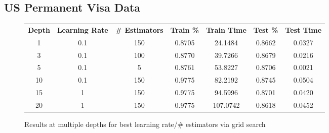 \documentclass[h]{article}
\begin{document}
\subsection*{US Permanent Visa Data}
\begin{figure}[H]
\begin{tabular}{ | c | c  | c | c | c | c | c |} 
\hline
\textbf{Depth} & \textbf{Learning Rate} & \textbf{\# Estimators} & \textbf{Train \%} & \textbf{Train Time} & \textbf{Test \%} & \textbf{Test Time}   \\
1 & 0.1 & 150 & 0.8705 & 24.1484 & 0.8662 & 0.0327 \\ \hline
3 & 0.1 & 100 & 0.8770 & 39.7266 & 0.8679 & 0.0216 \\ \hline
5 & 0.1 & 5 & 0.8761 & 53.8227 & 0.8706 & 0.0021 \\ \hline
10 & 0.1 & 150 & 0.9775 & 82.2192 & 0.8745 & 0.0504 \\ \hline
15 & 1 & 150 & 0.9775 & 94.5996 & 0.8701 & 0.0420 \\ \hline
20 & 1 & 150 & 0.9775 & 107.0742 & 0.8618 & 0.0452 \\ \hline
\hline
\end{tabular}
\caption*{Results at multiple depths for best learning rate/# estimators via grid search}
\endminipage\hfill
\end{figure}
\end{document}
